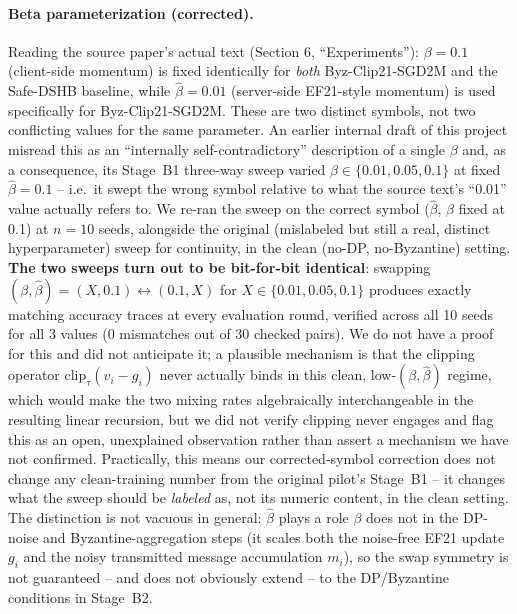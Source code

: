 \documentclass{article}
\begin{document}
\paragraph{Beta parameterization (corrected).} Reading the source paper's
actual text (Section 6, ``Experiments''): $\beta=0.1$ (client-side momentum)
is fixed identically for \emph{both} Byz-Clip21-SGD2M and the Safe-DSHB
baseline, while $\hat\beta=0.01$ (server-side EF21-style momentum) is used
specifically for Byz-Clip21-SGD2M. These are two distinct symbols, not two
conflicting values for the same parameter. An earlier internal draft of this
project misread this as an ``internally self-contradictory'' description of a
single $\beta$ and, as a consequence, its Stage~B1 three-way sweep varied
$\beta\in\{0.01,0.05,0.1\}$ at fixed $\hat\beta=0.1$ -- i.e.\ it swept the
wrong symbol relative to what the source text's ``0.01'' value actually
refers to. We re-ran the sweep on the correct symbol ($\hat\beta$, $\beta$
fixed at 0.1) at $n{=}10$ seeds, alongside the original (mislabeled but still
a real, distinct hyperparameter) sweep for continuity, in the clean
(no-DP, no-Byzantine) setting. \textbf{The two sweeps turn out to be
bit-for-bit identical}: swapping $(\beta,\hat\beta)=(X,0.1)\leftrightarrow
(0.1,X)$ for $X\in\{0.01,0.05,0.1\}$ produces exactly matching accuracy
traces at every evaluation round, verified across all 10 seeds for all 3
values (0 mismatches out of 30 checked pairs). We do not have a proof for
this and did not anticipate it; a plausible mechanism is that the clipping
operator $\mathrm{clip}_\tau(v_i-g_i)$ never actually binds in this clean,
low-$(\beta,\hat\beta)$ regime, which would make the two mixing rates
algebraically interchangeable in the resulting linear recursion, but we did
not verify clipping never engages and flag this as an open, unexplained
observation rather than assert a mechanism we have not confirmed. Practically,
this means our corrected-symbol correction does not change any clean-training
number from the original pilot's Stage~B1 -- it changes what the sweep should
be \emph{labeled} as, not its numeric content, in the clean setting. The
distinction is not vacuous in general: $\hat\beta$ plays a role $\beta$ does
not in the DP-noise and Byzantine-aggregation steps (it scales both the
noise-free EF21 update $g_i$ and the noisy transmitted message accumulation
$m_i$), so the swap symmetry is not guaranteed -- and does not obviously
extend -- to the DP/Byzantine conditions in Stage~B2.
\end{document}
